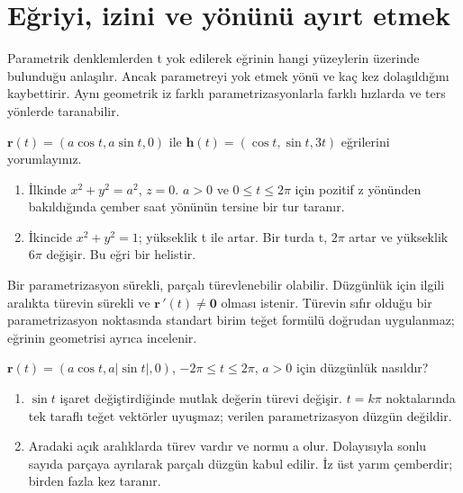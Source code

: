 \section{Eğriyi, izini ve yönünü ayırt etmek}
Parametrik denklemlerden t yok edilerek eğrinin hangi yüzeylerin üzerinde bulunduğu anlaşılır. Ancak parametreyi yok etmek yönü ve kaç kez dolaşıldığını kaybettirir. Aynı geometrik iz farklı parametrizasyonlarla farklı hızlarda ve ters yönlerde taranabilir.

\begin{tcolorbox}[title={Örnek 3.5 | Çember ve helis},colframe=accent]\(\mathbf r(t)=(a\cos t,a\sin t,0)\) ile \(\mathbf h(t)=(\cos t,\sin t,3t)\) eğrilerini yorumlayınız.
\par{}\end{tcolorbox}
\begin{tcolorbox}[title={Adım adım çözüm},colback=green!3!white,colframe=green]\begin{enumerate}
\item İlkinde \(x^2+y^2=a^2\), \(z=0\). \(a>0\) ve \(0\le t\le2\pi\) için pozitif z yönünden bakıldığında çember saat yönünün tersine bir tur taranır.
\item İkincide \(x^2+y^2=1\); yükseklik t ile artar. Bir turda t, \(2\pi\) artar ve yükseklik \(6\pi\) değişir. Bu eğri bir helistir.
\end{enumerate}\end{tcolorbox}
Bir parametrizasyon sürekli, parçalı türevlenebilir olabilir. Düzgünlük için ilgili aralıkta türevin sürekli ve \(\mathbf r\,\prime(t)\ne\mathbf0\) olması istenir. Türevin sıfır olduğu bir parametrizasyon noktasında standart birim teğet formülü doğrudan uygulanmaz; eğrinin geometrisi ayrıca incelenir.

\begin{tcolorbox}[title={Örnek 3.6 | Parçalı düzgün eğri},colframe=accent]\(\mathbf r(t)=(a\cos t,a|\sin t|,0)\), \(-2\pi\le t\le2\pi\), \(a>0\) için düzgünlük nasıldır?
\par{}\end{tcolorbox}
\begin{tcolorbox}[title={Adım adım çözüm},colback=green!3!white,colframe=green]\begin{enumerate}
\item \(\sin t\) işaret değiştirdiğinde mutlak değerin türevi değişir. \(t=k\pi\) noktalarında tek taraflı teğet vektörler uyuşmaz; verilen parametrizasyon düzgün değildir.
\item Aradaki açık aralıklarda türev vardır ve normu a olur. Dolayısıyla sonlu sayıda parçaya ayrılarak parçalı düzgün kabul edilir. İz üst yarım çemberdir; birden fazla kez taranır.
\end{enumerate}\end{tcolorbox}
